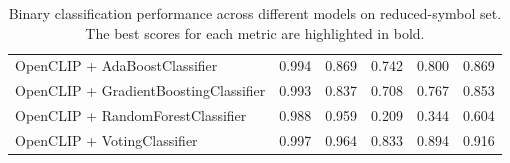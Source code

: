 \begin{table}[ht]
{\begin{tabular}{lccccc}
    OpenCLIP + AdaBoostClassifier         & 0.994             & 0.869              & 0.742           & 0.800             & 0.869          \\
    OpenCLIP + GradientBoostingClassifier & 0.993             & 0.837              & 0.708           & 0.767             & 0.853          \\
    OpenCLIP + RandomForestClassifier     & 0.988             & 0.959              & 0.209           & 0.344             & 0.604          \\
    OpenCLIP + VotingClassifier           & 0.997             & 0.964              & 0.833           & 0.894             & 0.916          \\
    \bottomrule
    \end{tabular}
  }
  \caption{Binary classification performance across different models on reduced-symbol set. The best scores for each metric are highlighted in bold.}
  \label{tab:binary-reduced-symbols-result}
\end{table}